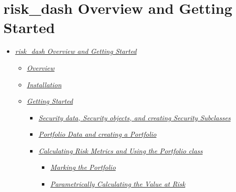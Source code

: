 \documentclass[letterpaper,10pt,english]{sphinxmanual}
\begin{document}
\chapter{risk\_dash Overview and Getting Started}
\label{\detokenize{gettingstarted:risk-dash-overview-and-getting-started}}\label{\detokenize{gettingstarted:gettingstarted}}\label{\detokenize{gettingstarted::doc}}\begin{itemize}
\item {} 
\sphinxAtStartPar
{\hyperref[\detokenize{gettingstarted:risk_dash-overview-and-getting-started}]{\emph{risk\_dash Overview and Getting
Started}}}
\begin{itemize}
\item {} 
\sphinxAtStartPar
{\hyperref[\detokenize{gettingstarted:overview}]{\emph{Overview}}}

\item {} 
\sphinxAtStartPar
{\hyperref[\detokenize{gettingstarted:installation}]{\emph{Installation}}}

\item {} 
\sphinxAtStartPar
{\hyperref[\detokenize{gettingstarted:getting-started}]{\emph{Getting Started}}}
\begin{itemize}
\item {} 
\sphinxAtStartPar
{\hyperref[\detokenize{gettingstarted:security-data-security-objects-and-creating-security-subclasses}]{\emph{Security data, Security objects, and creating Security
Subclasses}}}

\item {} 
\sphinxAtStartPar
{\hyperref[\detokenize{gettingstarted:portfolio-data-and-creating-a-portfolio}]{\emph{Portfolio Data and creating a
Portfolio}}}

\item {} 
\sphinxAtStartPar
{\hyperref[\detokenize{gettingstarted:calculating-risk-metrics-and-using-the-portfolio-class}]{\emph{Calculating Risk Metrics and Using the Portfolio
class}}}
\begin{itemize}
\item {} 
\sphinxAtStartPar
{\hyperref[\detokenize{gettingstarted:marking-the-portfolio}]{\emph{Marking the Portfolio}}}

\item {} 
\sphinxAtStartPar
{\hyperref[\detokenize{gettingstarted:parametrically-calculating-the-value-at-risk}]{\emph{Parametrically Calculating the Value at
Risk}}}

\end{itemize}


\end{itemize}
\end{itemize}
\end{itemize}
\end{document}
